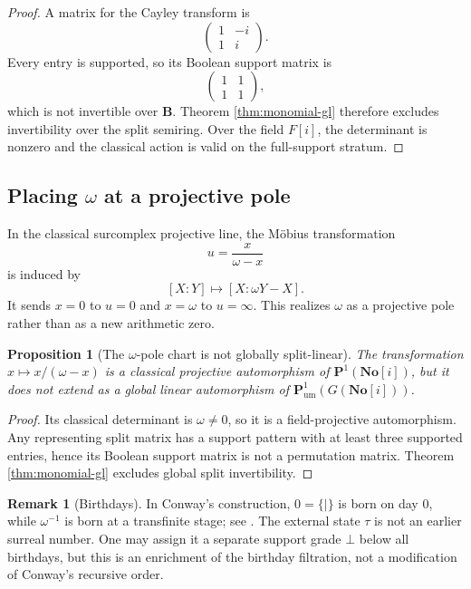 \documentclass[11pt]{amsart}
\numberwithin{equation}{section}
\newtheorem{proposition}[theorem]{Proposition}
\theoremstyle{definition}
\newtheorem{remark}[theorem]{Remark}
\newcommand{\B}{\mathbf B}
\newcommand{\No}{\mathbf{No}}
\newcommand{\Pum}{\mathbf P_{\mathrm{um}}}
\begin{document}
\begin{proof}
A matrix for the Cayley transform is
\[
\begin{pmatrix}
1&-i\\
1&i
\end{pmatrix}.
\]
Every entry is supported, so its Boolean support matrix is
\[
\begin{pmatrix}
1&1\\
1&1
\end{pmatrix},
\]
which is not invertible over $\B$.  Theorem \ref{thm:monomial-gl} therefore excludes invertibility over the split semiring.  Over the field $F[i]$, the determinant is nonzero and the classical action is valid on the full-support stratum.
\end{proof}

\subsection{Placing $\omega$ at a projective pole}

In the classical surcomplex projective line, the M\"obius transformation
\[
u=\frac{x}{\omega-x}
\]
is induced by
\[
[X:Y]\longmapsto[X:\omega Y-X].
\]
It sends $x=0$ to $u=0$ and $x=\omega$ to $u=\infty$.  This realizes $\omega$ as a projective pole rather than as a new arithmetic zero.

\begin{proposition}[The $\omega$-pole chart is not globally split-linear]\label{prop:omega-pole-obstruction}
The transformation $x\mapsto x/(\omega-x)$ is a classical projective automorphism of $\mathbf P^1(\No[i])$, but it does not extend as a global linear automorphism of $\Pum^1(G(\No[i]))$.
\end{proposition}

\begin{proof}
Its classical determinant is $\omega\neq0$, so it is a field-projective automorphism.  Any representing split matrix has a support pattern with at least three supported entries, hence its Boolean support matrix is not a permutation matrix.  Theorem \ref{thm:monomial-gl} excludes global split invertibility.
\end{proof}

\begin{remark}[Birthdays]
In Conway's construction, $0=\{\mid\}$ is born on day $0$, while $\omega^{-1}$ is born at a transfinite stage; see \cite{Conway,Simons}.  The external state $\tau$ is not an earlier surreal number.  One may assign it a separate support grade $\bot$ below all birthdays, but this is an enrichment of the birthday filtration, not a modification of Conway's recursive order.
\end{remark}
\end{document}
